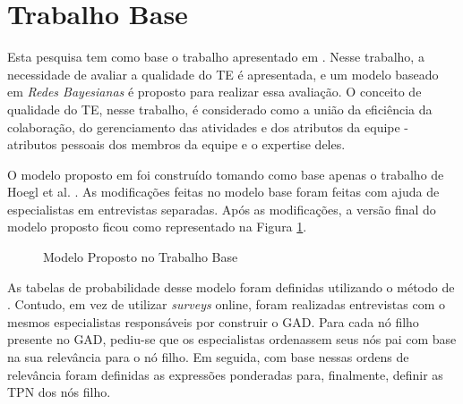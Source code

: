 \section{Trabalho Base}
\label{trabalhos:base}

Esta pesquisa tem como base o trabalho apresentado em \cite{freire}. Nesse trabalho, a necessidade de avaliar a qualidade do TE é apresentada, e um modelo baseado em \textit{Redes Bayesianas} é proposto para realizar essa avaliação. O conceito de qualidade do TE, nesse trabalho, é considerado como a união da eficiência da colaboração, do gerenciamento das atividades e dos atributos da equipe - atributos pessoais dos membros da equipe e o expertise deles.

O modelo proposto em \cite{freire} foi construído tomando como base apenas o trabalho de Hoegl et al. \cite{hoegl}. As modificações feitas no modelo base foram feitas com ajuda de especialistas em entrevistas separadas. Após as modificações, a versão final do modelo proposto ficou como representado na Figura \ref{trabalho:base:modelo}.

\begin{figure}[ht!]
\begin{center}
    \end{center}
    \caption{Modelo Proposto no Trabalho Base}
    \label{trabalho:base:modelo}
\end{figure}

As tabelas de probabilidade desse modelo foram definidas utilizando o método de \cite{perkusichNPT}. Contudo, em vez de utilizar \textit{surveys} online, foram realizadas entrevistas com o mesmos especialistas responsáveis por construir o GAD. Para cada nó filho presente no GAD, pediu-se que os especialistas ordenassem seus nós pai com base na sua relevância para o nó filho. Em seguida, com base nessas ordens de relevância foram definidas as expressões ponderadas para, finalmente, definir as TPN dos nós filho.

